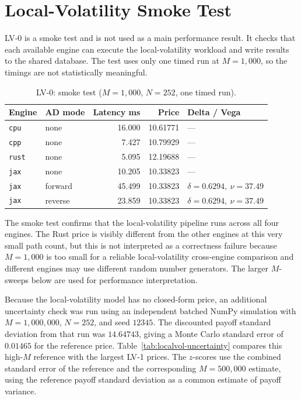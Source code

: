 \section{Local-Volatility Smoke Test}
\label{sec:results-lv0}

LV-0 is a smoke test and is not used as a main performance result.  It checks
that each available engine can execute the local-volatility workload and
write results to the shared database.  The test uses only one timed run at
\(M=1{,}000\), so the timings are not statistically meaningful.

\begin{table}[htbp]
\centering
\small
\caption{LV-0: smoke test (\(M=1{,}000\), \(N=252\), one timed run).}
\label{tab:lv0-smoke}
\begin{tabular}{llrrl}
\toprule
\textbf{Engine} & \textbf{AD mode} & \textbf{Latency ms}
& \textbf{Price} & \textbf{Delta / Vega} \\
\midrule
\texttt{cpu}  & none    & 16.000 & 10.61771 & --- \\
\texttt{cpp}  & none    &  7.427 & 10.79929 & --- \\
\texttt{rust} & none    &  5.095 & 12.19688 & --- \\
\texttt{jax}  & none    & 10.205 & 10.33823 & --- \\
\texttt{jax}  & forward & 45.499 & 10.33823 & \(\delta=0.6294,\ \nu=37.49\) \\
\texttt{jax}  & reverse & 23.859 & 10.33823 & \(\delta=0.6294,\ \nu=37.49\) \\
\bottomrule
\end{tabular}
\end{table}

The smoke test confirms that the local-volatility pipeline runs across all
four engines.  The Rust price is visibly different from the other engines at
this very small path count, but this is not interpreted as a correctness
failure because \(M=1{,}000\) is too small for a reliable local-volatility
cross-engine comparison and different engines may use different random
number generators.  The larger \(M\)-sweeps below are used for performance
interpretation.

Because the local-volatility model has no closed-form price, an additional
uncertainty check was run using an independent batched NumPy simulation with
\(M=1{,}000{,}000\), \(N=252\), and seed \(12345\). The discounted payoff
standard deviation from that run was \(14.64743\), giving a Monte Carlo
standard error of \(0.01465\) for the reference price. Table~\ref{tab:localvol-uncertainty}
compares this high-\(M\) reference with the largest LV-1 prices. The
\(z\)-scores use the combined standard error of the reference and the
corresponding \(M=500{,}000\) estimate, using the reference payoff standard
deviation as a common estimate of payoff variance.

